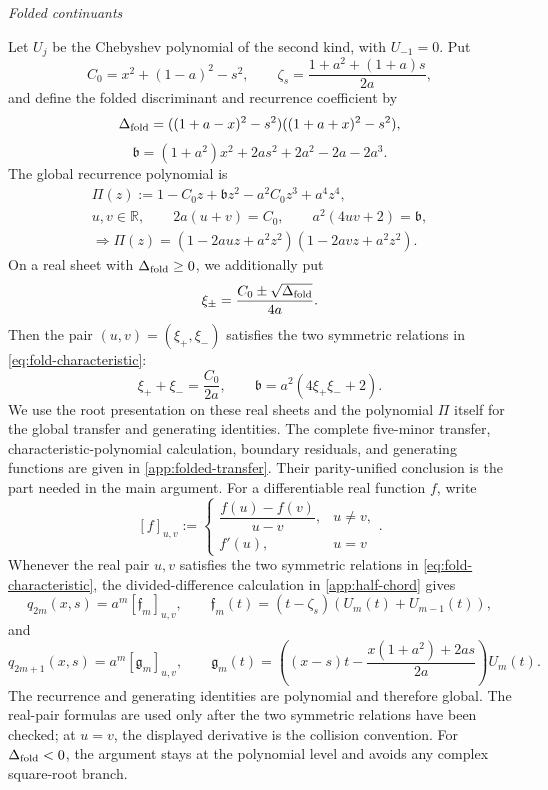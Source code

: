 \documentclass[a4paper,preprint,12pt,nopreprintline,sort&compress]{elsarticle}
\numberwithin{equation}{section}
\theoremstyle{remark}
\newcommand{\proofstage}[1]{%
  \par\medskip\noindent\textit{#1}\par\nobreak\smallskip}
\begin{document}
\proofstage{Folded continuants}
Let \(U_j\) be the Chebyshev polynomial of the second kind, with
\(U_{-1}=0\).  Put
\[
 C_0=x^2+(1-a)^2-s^2,\qquad
 \zeta_s=\frac{1+a^2+(1+a)s}{2a},
\]
and define the folded discriminant and recurrence coefficient by
\[
 \Delta_{\rm fold}=((1+a-x)^2-s^2)((1+a+x)^2-s^2),
\]
\[
 \mathfrak b=(1+a^2)x^2+2as^2+2a^2-2a-2a^3.
\]
The global recurrence polynomial is
\begin{equation}\label{eq:fold-characteristic}
\begin{gathered}
 \Pi(z):=1-C_0z+\mathfrak b z^2-a^2C_0z^3+a^4z^4,\\
 u,v\in\mathbb R,\qquad
 2a(u+v)=C_0,\qquad a^2(4uv+2)=\mathfrak b,\\
 \Longrightarrow
 \Pi(z)=(1-2auz+a^2z^2)(1-2avz+a^2z^2).
\end{gathered}
\end{equation}
On a real sheet with \(\Delta_{\rm fold}\geq0\), we additionally put
\[
 \xi_\pm=\frac{C_0\pm\sqrt{\Delta_{\rm fold}}}{4a}.
\]
Then the pair \((u,v)=(\xi_+,\xi_-)\) satisfies the two symmetric
relations in \eqref{eq:fold-characteristic}:
\[
 \xi_++\xi_-=\frac{C_0}{2a},\qquad
 \mathfrak b=a^2(4\xi_+\xi_-+2).
\]
We use the root presentation on these real sheets and the polynomial
\(\Pi\) itself for the global transfer and generating identities.
The complete five-minor transfer, characteristic-polynomial calculation,
boundary residuals, and generating functions are given in
\cref{app:folded-transfer}.  Their parity-unified conclusion is the part
needed in the main argument.  For a differentiable real function \(f\), write
\[
 [f]_{u,v}:=
 \begin{cases}
  \dfrac{f(u)-f(v)}{u-v},&u\neq v,\\[2mm]
  f'(u),&u=v
 \end{cases}.
\]
Whenever the real pair \(u,v\) satisfies the two symmetric relations in
\eqref{eq:fold-characteristic}, the divided-difference calculation in
\cref{app:half-chord} gives
\begin{equation}\label{eq:fold-even}
 q_{2m}(x,s)=a^m[\mathfrak f_m]_{u,v},\qquad
 \mathfrak f_m(t)=(t-\zeta_s)(U_m(t)+U_{m-1}(t)),
\end{equation}
and
\begin{equation}\label{eq:fold-odd}
 q_{2m+1}(x,s)=a^m[\mathfrak g_m]_{u,v},\qquad
 \mathfrak g_m(t)=\left((x-s)t-
 \frac{x(1+a^2)+2as}{2a}\right)U_m(t).
\end{equation}
The recurrence and generating identities are polynomial and therefore
global.  The real-pair formulas are used only after the two symmetric
relations have been checked; at \(u=v\), the displayed derivative is the
collision convention.  For \(\Delta_{\rm fold}<0\), the argument stays at
the polynomial level and avoids any complex square-root branch.
\end{document}
